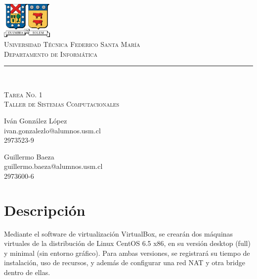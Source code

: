 \documentclass[11pt]{article}
\makeatletter
\newcommand{\labno}{1}
\newcommand{\labtitle}{Taller de Sistemas Computacionales}
\newcommand{\nameone}{Iván González López}
\newcommand{\emailone}{ivan.gonzalezlo@alumnos.usm.cl}
\newcommand{\rolone}{2973523-9}
\newcommand{\nametwo}{Guillermo Baeza}
\newcommand{\emailtwo}{guillermo.baeza@alumnos.usm.cl}
\newcommand{\roltwo}{2973600-6}
\makeatother
\begin{document}
\begin{titlepage}
\begin{center}


\includegraphics[width=70pt]{logos/utfsm.pdf} \\
{\Large \textsc{Universidad Técnica Federico Santa María} \\}
{\Large \textsc{Departamento de Informática} \\ \vspace{4pt}}
{\rule[13pt]{\textwidth}{1pt} \\ \vspace{25pt}}
{\LARGE \textsc{Tarea No. \labno} \\}
{\LARGE \textsc{\labtitle} \\ \vspace{50pt}}

\begin{minipage}{0.4\textwidth}
\begin{flushleft}
{\large \nameone} \\
\emailone \\
\rolone
\end{flushleft}
\end{minipage}
\hfill
\begin{minipage}{0.4\textwidth}
\begin{flushright}
{\large \nametwo} \\
\emailtwo \\
\roltwo
\end{flushright}
\end{minipage}
\end{center}
\end{titlepage}


\section{Descripción}
Mediante el software de virtualización VirtualBox, se crearán dos máquinas virtuales de la distribución de Linux CentOS 6.5 x86, en su versión desktop (full) y minimal (sin entorno gráfico). Para ambas versiones, se registrará su tiempo de instalación, uso de recursos, y además de configurar una red NAT y otra bridge dentro de ellas.   
\end{document}
